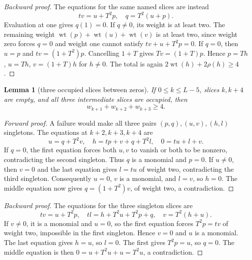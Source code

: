 \documentclass{article}
\newtheorem{lemma}{Lemma}
\DeclareMathOperator{\wt}{wt}
\begin{document}
\begin{proof}[Backward proof]
  The equations for the same named slices are instead
  \begin{equation}
    tv = u + T^2 p, \quad q = T^2 (u + p).
  \end{equation}
  Evaluation at one gives \(q(1) = 0\). If \(q \ne 0\), its weight is at least two. The remaining
  weight \(\wt(p) + \wt(u) + \wt(v)\) is at least two, since weight zero forces \(q = 0\) and
  weight one cannot satisfy \(tv + u + T^2 p = 0\). If \(q = 0\), then \(u = p\) and
  \(tv = (1 + T^2)p\). Cancelling \(1 + T\) gives \(Tv = (1 + T)p\). Hence \(p = Th\), \(u = Th\),
  \(v = (1 + T)h\) for \(h \ne 0\). The total is again \(2\wt(h) + 2\rho(h) \ge 4\).
\end{proof}

\begin{lemma}[three occupied slices between zeros]\label{lem:three}
  If \(0 \le k \le L-5\), slices \(k, k + 4\) are empty, and all three intermediate slices are
  occupied, then
  \begin{equation}
    w_{k+1} + w_{k+2} + w_{k+3} \ge 4.
  \end{equation}
\end{lemma}

\begin{proof}[Forward proof]
  A failure would make all three pairs \((p,q), (u,v), (h,l)\) singletons. The equations at
  \(k + 2, k + 3, k + 4\) are
  \begin{equation}
    u = q + T^2 v, \quad h = tp + v + q + T^2 l, \quad 0 = tu + l + v.
  \end{equation}
  If \(q = 0\), the first equation forces both \(u, v\) to vanish or both to be nonzero,
  contradicting the second singleton. Thus \(q\) is a monomial and \(p = 0\). If \(u \ne 0\), then
  \(v = 0\) and the last equation gives \(l = tu\) of weight two, contradicting the third
  singleton. Consequently \(u = 0\), \(v\) is a monomial, and \(l = v\), so \(h = 0\). The middle
  equation now gives \(q = (1 + T^2)v\), of weight two, a contradiction.
\end{proof}

\begin{proof}[Backward proof]
  The equations for the three singleton slices are
  \begin{equation}
    tv = u + T^2 p, \quad tl = h + T^2 u + T^2 p + q, \quad v = T^2 (h + u).
  \end{equation}
  If \(v \ne 0\), it is a monomial and \(u = 0\), so the first equation forces \(T^2 p = tv\) of
  weight two, impossible in the first singleton. Hence \(v = 0\) and \(u\) is a monomial. The last
  equation gives \(h = u\), so \(l = 0\). The first gives \(T^2 p = u\), so \(q = 0\). The middle
  equation is then \(0 = u + T^2 u + u = T^2 u\), a contradiction.
\end{proof}
\end{document}
